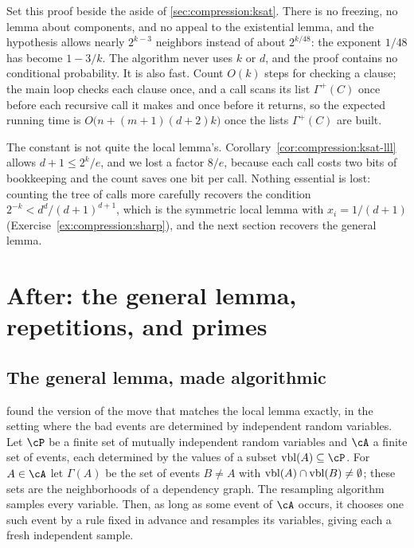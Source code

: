 \begin{refsection}
Set this proof beside the aside of \cref{sec:compression:ksat}. There is no freezing, no lemma about components, and no appeal to the existential lemma, and the hypothesis allows nearly $2^{k-3}$ neighbors instead of about $2^{k/48}$: the exponent $1/48$ has become $1-3/k$. The algorithm never uses $k$ or $d$, and the proof contains no conditional probability. It is also fast. Count $O(k)$ steps for checking a clause; the main loop checks each clause once, and a call scans its list $\Gamma^+(C)$ once before each recursive call it makes and once before it returns, so the expected running time is $O\bigl(n+(m+1)(d+2)k\bigr)$ once the lists $\Gamma^+(C)$ are built.

The constant is not quite the local lemma's. Corollary~\ref{cor:compression:ksat-lll} allows $d+1\le2^k/e$, and we lost a factor $8/e$, because each call costs two bits of bookkeeping and the count saves one bit per call. Nothing essential is lost: counting the tree of calls more carefully recovers the condition $2^{-k}<d^d/(d+1)^{d+1}$, which is the symmetric local lemma with $x_i=1/(d+1)$ (Exercise~\ref{ex:compression:sharp}), and the next section recovers the general lemma.

\section{After: the general lemma, repetitions, and primes}\label{sec:compression:beyond}

\subsection{The general lemma, made algorithmic}\label{sec:compression:mt}

\Textcite{MoserTardos2010} found the version of the move that matches the local lemma exactly, in the setting where the bad events are determined by independent random variables. Let $\cP$ be a finite set of mutually independent random variables and $\cA$ a finite set of events, each determined by the values of a subset $\compressionVbl(A)\subseteq\cP$. For $A\in\cA$ let $\Gamma(A)$ be the set of events $B\ne A$ with $\operatorname{vbl}(A)\cap\operatorname{vbl}(B)\neq\emptyset$; these sets are the neighborhoods of a dependency graph. The resampling algorithm samples every variable. Then, as long as some event of $\cA$ occurs, it chooses one such event by a rule fixed in advance and resamples its variables, giving each a fresh independent sample.


\end{refsection}
